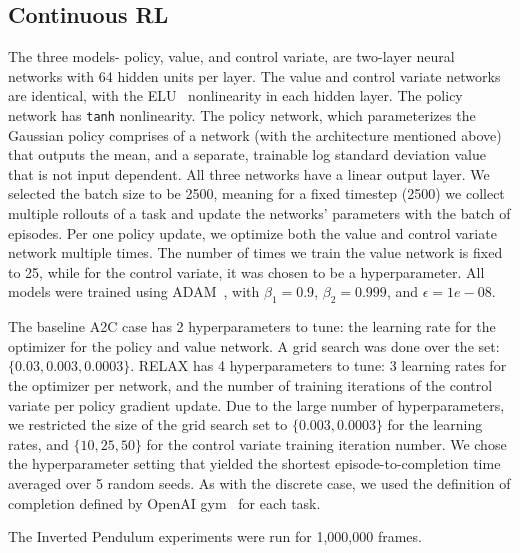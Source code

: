 \documentclass{article}
\newcommand{\RELAX}{{\textnormal{RELAX}}}
\begin{document}
\subsection{Continuous RL}
The three models- policy, value, and control variate, are two-layer neural networks with 64 hidden units per layer.
The value and control variate networks are identical, with the ELU~\citep{Clevert2016ELUs} nonlinearity in each hidden layer.
The policy network has \texttt{tanh} nonlinearity.
The policy network, which parameterizes the Gaussian policy comprises of a network (with the architecture mentioned above) that outputs the mean, and a separate, trainable log standard deviation value that is not input dependent.
All three networks have a linear output layer.
We selected the batch size to be 2500, meaning for a fixed timestep (2500) we collect multiple rollouts of a task and update the networks' parameters with the batch of episodes.
Per one policy update, we optimize both the value and control variate network multiple times.
The number of times we train  the value network is fixed to 25, while for the control variate, it was chosen to be a hyperparameter. 
All models were trained using ADAM~\citep{kingma2015adam}, with $\beta_1=0.9$, $\beta_2=0.999$, and $\epsilon=1e-08$. 

The baseline A2C case has 2 hyperparameters to tune: the learning rate for the optimizer for the policy and value network.
A grid search was done over the set: $\{0.03, 0.003, 0.0003\}$.
\RELAX{} has 4 hyperparameters to tune: 3 learning rates for the optimizer per network, and the number of training iterations of the control variate per policy gradient update.
Due to the large number of hyperparameters, we restricted the size of the grid search set to $\{0.003, 0.0003\}$ for the learning rates, and $\{10, 25, 50\}$ for the control variate training iteration number.
We chose the hyperparameter setting that yielded the shortest episode-to-completion time averaged over 5 random seeds.
As with the discrete case, we used the definition of completion defined by OpenAI gym~\citep{1606.01540} for each task. 

The Inverted Pendulum experiments were run for 1,000,000 frames.
\end{document}

